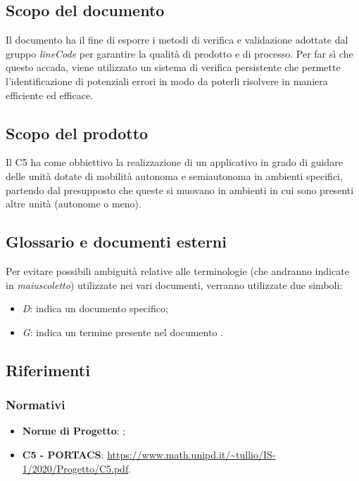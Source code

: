 \subsection{Scopo del documento}
Il documento ha il fine di esporre i metodi di verifica e validazione adottate dal gruppo \textit{lineCode} per garantire la qualità di prodotto e di processo. Per far sì che questo accada, viene utilizzato un sistema di verifica persistente che permette l'identificazione di potenziali errori in modo da poterli risolvere in maniera efficiente ed efficace.

\subsection{Scopo del prodotto}
Il  C5 ha come obbiettivo la realizzazione di un applicativo  in grado di guidare delle unità dotate di mobilità autonoma e semiautonoma in ambienti specifici, partendo dal presupposto che queste si muovano in ambienti in cui sono presenti altre unità (autonome o meno).

\subsection{Glossario e documenti esterni}
Per evitare possibili ambiguità relative alle terminologie (che andranno indicate in \textit{maiuscoletto}) utilizzate nei vari documenti, verranno utilizzate due simboli:
\begin{itemize}
	\item \textit{D}: indica un documento specifico;
	\item \textit{G}: indica un termine presente nel documento .
\end{itemize}

\subsection{Riferimenti}

\subsubsection{Normativi}
\begin{itemize}
	\item \textbf{Norme di Progetto}: ;
	\item \textbf{ C5 - PORTACS}:					\url{https://www.math.unipd.it/~tullio/IS-1/2020/Progetto/C5.pdf}.
\end{itemize}


